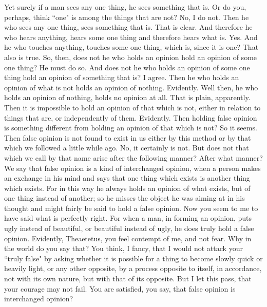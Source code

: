 \documentclass[letterpaper,12pt]{article}
\newcommand{\stephpag}[1]{\marginnote{\small\itshape\fontfamily{ppl}\selectfont #1}}
\begin{document}
\begin{drama}
Yet surely if a man sees any one thing, he sees something that is. Or do you, perhaps, think ``one" is among the things that are not?
\theaetetusspeaks
No, I do not.
\socratesspeaks
Then he who sees any one thing, sees something that is.
\theaetetusspeaks
That is clear. \stephpag{189 a}
\socratesspeaks
And therefore he who hears anything, hears some one thing and therefore hears what is.
\theaetetusspeaks
Yes.
\socratesspeaks
And he who touches anything, touches some one thing, which is, since it is one?
\theaetetusspeaks
That also is true.
\socratesspeaks
So, then, does not he who holds an opinion hold an opinion of some one thing?
\theaetetusspeaks
He must do so.
\socratesspeaks
And does not he who holds an opinion of some one thing hold an opinion of something that is?
\theaetetusspeaks
I agree.
\socratesspeaks
Then he who holds an opinion of what is not holds an opinion of nothing.
\theaetetusspeaks
Evidently.
\socratesspeaks
Well then, he who holds an opinion of nothing, holds no opinion at all.
\theaetetusspeaks
That is plain, apparently. \stephpag{b}
\socratesspeaks
Then it is impossible to hold an opinion of that which is not, either in relation to things that are, or independently of them.
\theaetetusspeaks
Evidently.
\socratesspeaks
Then holding false opinion is something different from holding an opinion of that which is not?
\theaetetusspeaks
So it seems.
\socratesspeaks
Then false opinion is not found to exist in us either by this method or by that which we followed a little while ago.
\theaetetusspeaks
No, it certainly is not.
\socratesspeaks
But does not that which we call by that name arise after the following manner?
\theaetetusspeaks
After what manner?
\socratesspeaks
We say that false opinion is a kind of interchanged opinion, \stephpag{c} when a person makes an exchange in his mind and says that one thing which exists is another thing which exists. For in this way he always holds an opinion of what exists, but of one thing instead of another; so he misses the object he was aiming at in his thought and might fairly be said to hold a false opinion.
\theaetetusspeaks
Now you seem to me to have said what is perfectly right. For when a man, in forming an opinion, puts ugly instead of beautiful, or beautiful instead of ugly, he does truly hold a false opinion.
\socratesspeaks
Evidently, Theaetetus, you feel contempt of me, and not fear.
\theaetetusspeaks
Why in the world do you say that?
\socratesspeaks
You think, I fancy, that I would not attack your ``truly false" \stephpag{d} by asking whether it is possible for a thing to become slowly quick or heavily light, or any other opposite, by a process opposite to itself, in accordance, not with its own nature, but with that of its opposite. But I let this pass, that your courage may not fail. You are satisfied, you say, that false opinion is interchanged opinion?

\end{drama}
\end{document}
